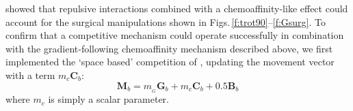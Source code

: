 \documentclass[11pt, a4paper, draft]{article}
\begin{document}
\citet{simpson_simple_2011} showed that repulsive interactions combined with a
chemoaffinity-like effect could account for the surgical manipulations shown
in Figs.\,\ref{f:trot90}--\ref{f:Gsurg}. To confirm that a competitive
mechanism could operate successfully in combination with the
gradient-following chemoaffinity mechanism described above, we first
implemented the `space based' competition of \citet{simpson_simple_2011},
updating the movement vector with a term $m_c \mathbf{C}_b$:
\begin{equation} \label{e:mv2}
 \mathbf{M}_{b} = m_{\!_G} \mathbf{G}_b +  m_c \mathbf{C}_b + 0.5 \mathbf{B}_b
\end{equation}
where $m_c$ is simply a scalar parameter.
%
%
%
%
%
\end{document}

